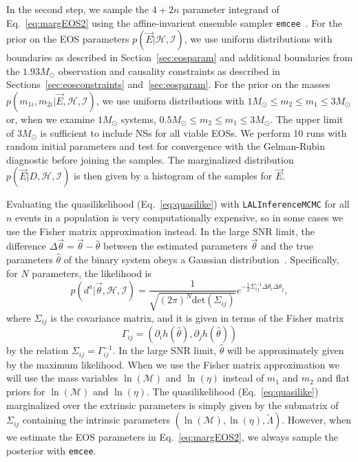 \documentclass[twocolumn,prd,amssymb,aps,nofootinbib,showpacs,epsf]{revtex4}
\begin{document}
In the second step, we sample the $4+2n$ parameter integrand of Eq.~\eqref{eq:margEOS2} using the affine-invarient ensemble sampler \texttt{emcee}~\cite{ForemanMackeyHogg2013}. For the prior on the EOS parameters $p(\vec E | \mathcal{H},\mathcal{I})$, we use uniform distributions with boundaries as described in Section~\ref{sec:eosparam} and additional boundaries from the $1.93M_\odot$ observation and causality constraints as described in Sections~\ref{sec:eosconstraints} and~\ref{sec:eosparam}. For the prior on the masses $p(m_{1i}, m_{2i} | \vec E, \mathcal{H},\mathcal{I})$, we use uniform distributions with $1M_\odot \le m_2 \le m_1 \le 3M_\odot$ or, when we examine $1M_\odot$ systems, $0.5M_\odot \le m_2 \le m_1 \le 3M_\odot$. The upper limit of $3M_\odot$ is sufficient to include NSs for all viable EOSs. We perform 10 runs with random initial parameters and test for convergence with the Gelman-Rubin diagnostic before joining the samples. 
The marginalized distribution $p(\vec E|D, \mathcal{H}, \mathcal{I})$ is then given by a histogram of the samples for $\vec E$.

Evaluating the quasilikelihood (Eq.~\eqref{eq:quasilike}) with \texttt{LALInferenceMCMC} for all $n$ events in a population is very computationally expensive, so in some cases we use the Fisher matrix approximation instead. In the large SNR limit, the difference $\Delta\vec\theta = \vec\theta - \hat\theta$ between the estimated parameters $\vec\theta$ and the true parameters $\hat\theta$ of the binary system obeys a Gaussian distribution~\cite{FinnChernoff1993}. Specifically, for $N$ parameters, the likelihood is
\begin{equation}
\label{eq:gaussianlike}
p(d^a | \vec\theta,\mathcal{H},\mathcal{I}) = \frac{1}{\sqrt{(2\pi)^N \mathrm{det}(\Sigma_{ij})}} e^{-\frac{1}{2} \Sigma^{-1}_{ij} \Delta\theta_i \Delta\theta_j},
\end{equation}
where $\Sigma_{ij}$ is the covariance matrix, and it is given in terms of the Fisher matrix
\begin{equation}
\Gamma_{ij} = (\partial_i h(\hat\theta), \partial_j h(\hat\theta))
\end{equation}
by the relation $\Sigma_{ij}  = \Gamma^{-1}_{ij}$. In the large SNR limit, $\hat\theta$ will be approximately given by the maximum likelihood. When we use the Fisher matrix approximation we will use the mass variables $\ln(\mathcal{M})$ and $\ln(\eta)$ instead of $m_1$ and $m_2$ and flat priors for $\ln(\mathcal{M})$ and $\ln(\eta)$. The quasilikelihood (Eq.~\eqref{eq:quasilike}) marginalized over the extrinsic parameters is simply given by the submatrix of $\Sigma_{ij}$ containing the intrinsic parameters $(\ln(\mathcal{M}), \ln(\eta), \tilde\Lambda)$. However, when we estimate the EOS parameters in Eq.~\eqref{eq:margEOS2}, we always sample the posterior with \texttt{emcee}.
\end{document}
